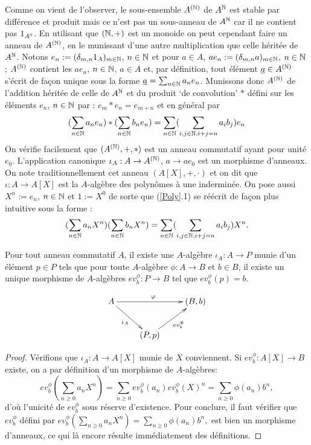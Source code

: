 Comme on vient de l'observer, le sous-ensemble $A^{(\mathbb{N})}$ de $ A^{\mathbb{N}}$ est stable par différence et produit mais ce n'est pas un sous-anneau de $A^{\mathbb{N}}$ car il ne contient pas $1_{A^{\mathbb{N}}}$. En utilisant que $(\mathbb{N},+)$ est un monoide on peut cependant    faire un anneau de $A^{(\mathbb{N})}$, en le munissant d'une autre multiplication que celle héritée de $A^{\mathbb{N}}$. Notons  $e_n:=(\delta_{m,n}1_{A})_{m\in \mathbb{N}}$, $n\in \mathbb{N}$ et pour $a\in A$, $ae_n:=(\delta_{m,n}a)_{m\in \mathbb{N}}$, $n\in \mathbb{N}$ ; $A^{(\mathbb{N})}$ contient les $ae_n$, $n\in \mathbb{N}$, $a\in A$ et, par définition,  tout élément $\underline{a}\in A^{(\mathbb{N})}$ s'écrit de façon unique sous la forme $\underline{a}=\sum_{n\in \mathbb{N}}a_ne_n$. Munissons donc $A^{(\mathbb{N})}$ de l'addition héritée de celle de $A^{\mathbb{N}}$ et du produit `de convolution' $*$ défini sur les éléments $e_n$, $n\in \mathbb{N}$ par :
$e_m*e_n=e_{m+n} $ et en général par
\begin{equation}(\sum_{n\in\mathbb{N}}a_ne_n) *(\sum_{n\in \mathbb{N}}b_ne_n)=\sum_{n\in \mathbb{N}}(\sum_{i,j\in \mathbb{N}, i+j=n}a_ib_j)e_n\end{equation} %
On vérifie facilement que $(A^{(\mathbb{N})},+,*)$ est un anneau commutatif ayant pour unité $e_0$. L'application canonique $\iota_A:A\rightarrow A^{(\mathbb{N})}$, $a\rightarrow ae_0  $  est un morphisme d'anneaux.
 On note traditionnellement cet anneau $(A[X],+,\cdot)$ et on dit que $\iota:A\rightarrow A[X]$ est la $A$-algèbre des polynômes à une inderminée. On pose aussi $X^n:=e_n$, $n\in \mathbb{N}$ et $1:=X^0$ de sorte que (\ref{Poly}.1) se réécrit de façon plus intuitive sous la forme :
 \begin{equation}(\sum_{n\in\mathbb{N}}a_nX^n)(\sum_{n\in \mathbb{N}}b_nX^n)=\sum_{n\in \mathbb{N}}(\sum_{i,j\in \mathbb{N}, i+j=n}a_ib_j)X^n.\end{equation} 

 \begin{lemme}Pour tout anneau commutatif $A$, il existe une $A$-algèbre $\iota_A: A\rightarrow P$ munie d'un élément $p\in P$ tels que pour toute $A$-algèbre $\phi: A\rightarrow B$ et  $b\in B$, il existe un unique  morphisme de $A$-algèbres $ev^\phi_b:P\rightarrow B$  tel que $ ev^\phi_b(p)=b$.\end{lemme}

	$$ \xymatrix{A \ar[rd]_{\iota_A} \ar[rr]^\varphi && (B, b) \\ & (P, p) \ar[ru]_{ev_b^\Phi}} $$

\begin{proof} Vérifions que $\iota_A:A\rightarrow A[X]$ munie de $X$ conviennent. Si $ev_b^\phi:A[X]\rightarrow B$ existe,  on a par définition d'un morphisme de $A$-algèbres:
$$ev^\phi_b(\sum_{n\geq 0}a_nX^n)=\sum_{n\geq 0}ev_b^\phi(a_n)ev_b^\phi(X)^n=\sum_{n\geq 0}\phi(a_n)b^n,$$
d'où l'unicité de $ev_b^\phi$ sous réserve d'existence.  Pour conclure, il faut vérifier que $ev_b^\phi$ défini par  $ev^\phi_b(\sum_{n\geq 0}a_nX^n)= \sum_{n\geq 0}\phi(a_n)b^n,$ est bien un morphisme d'anneaux, ce qui là encore résulte immédiatement des définitions.
\end{proof}

